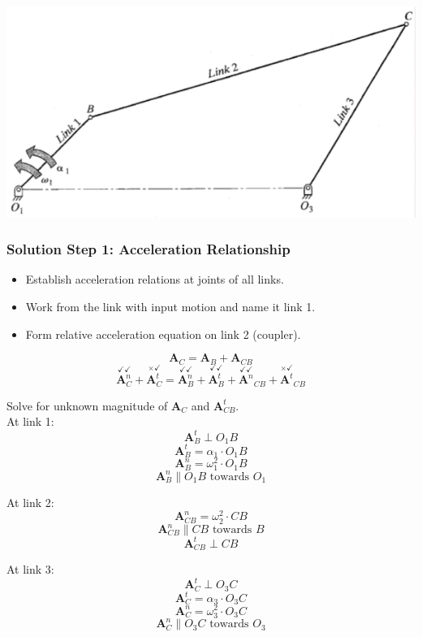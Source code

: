 \documentclass[11pt]{article}
\begin{document}
\begin{center}
\includegraphics[width=.9\linewidth]{./images/4-bar-linkage-graphical-acceleration-analysis-example.png}
\end{center}

 \newpage
\subsubsection{Solution Step 1: Acceleration Relationship}
\label{sec:orga44e31b}
\begin{itemize}
\item Establish acceleration relations at joints of all links.
\item Work from the link with input motion and name it link 1.
\item Form relative acceleration equation on link 2 (coupler).
\end{itemize}
\[\boldsymbol{A}_C = \boldsymbol{A}_B + \boldsymbol{A}_{CB}\]
\[\overset{\checkmark \checkmark}{\boldsymbol{A}_C^n} + \overset{\times \checkmark}{\boldsymbol{A}_C^t} = \overset{\checkmark \checkmark}{\boldsymbol{A}_B^n} + \overset{\checkmark \checkmark}{\boldsymbol{A}_B^t} + \overset{\checkmark \checkmark}{\boldsymbol{A}^n}_{CB} +  \overset{\times \checkmark}{\boldsymbol{A}^t}_{CB}\]

Solve for unknown magnitude of \(\boldsymbol{A}_C\) and \(\boldsymbol{A}_{CB}^t\).  \\

At link 1:
\[\boldsymbol{A}_B^t \perp O_1 B\]
\[\boldsymbol{A}_B^t = \alpha_1 \cdot O_1 B\]
\[\boldsymbol{A}_B^n = \omega_1^2 \cdot O_1 B\]
\[\boldsymbol{A}_B^n \parallel O_1 B \text{ towards } O_1\]

At link 2:
\[\boldsymbol{A}_{CB}^n = \omega_2^2 \cdot CB\]
\[\boldsymbol{A}_{CB}^n \parallel CB \text{ towards } B\]
\[\boldsymbol{A}_{CB}^t \perp CB\]

At link 3:
\[\boldsymbol{A}_C^t \perp O_3 C\]
\[\boldsymbol{A}_C^t = \alpha_3 \cdot O_3 C\]
\[\boldsymbol{A}_C^n = \omega_3^2 \cdot O_3 C\]
\[\boldsymbol{A}_C^n \parallel O_3 C \text{ towards } O_3\]
\end{document}
